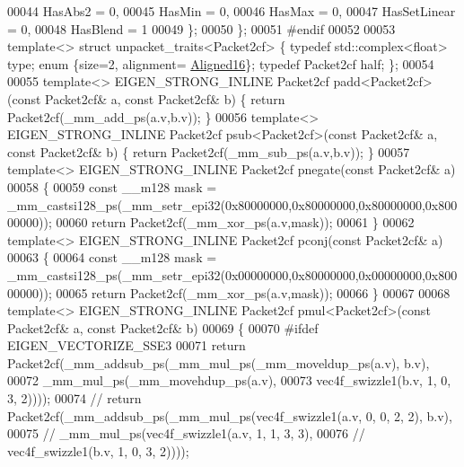 \begin{DoxyCode}
00044     HasAbs2   = 0,
00045     HasMin    = 0,
00046     HasMax    = 0,
00047     HasSetLinear = 0,
00048     HasBlend = 1
00049   \};
00050 \};
00051 \textcolor{preprocessor}{#endif}
00052 
00053 \textcolor{keyword}{template}<> \textcolor{keyword}{struct }unpacket\_traits<Packet2cf> \{ \textcolor{keyword}{typedef} std::complex<float> type; \textcolor{keyword}{enum} \{size=2, alignment=
      \hyperlink{group__enums_gga45fe06e29902b7a2773de05ba27b47a1af8e2bf74b04c02199f62c5e3c06dbfcc}{Aligned16}\}; \textcolor{keyword}{typedef} Packet2cf half; \};
00054 
00055 \textcolor{keyword}{template}<> EIGEN\_STRONG\_INLINE Packet2cf padd<Packet2cf>(\textcolor{keyword}{const} Packet2cf& a, \textcolor{keyword}{const} Packet2cf& b) \{ \textcolor{keywordflow}{return} 
      Packet2cf(\_mm\_add\_ps(a.v,b.v)); \}
00056 \textcolor{keyword}{template}<> EIGEN\_STRONG\_INLINE Packet2cf psub<Packet2cf>(\textcolor{keyword}{const} Packet2cf& a, \textcolor{keyword}{const} Packet2cf& b) \{ \textcolor{keywordflow}{return} 
      Packet2cf(\_mm\_sub\_ps(a.v,b.v)); \}
00057 \textcolor{keyword}{template}<> EIGEN\_STRONG\_INLINE Packet2cf pnegate(\textcolor{keyword}{const} Packet2cf& a)
00058 \{
00059   \textcolor{keyword}{const} \_\_m128 mask = \_mm\_castsi128\_ps(\_mm\_setr\_epi32(0x80000000,0x80000000,0x80000000,0x80000000));
00060   \textcolor{keywordflow}{return} Packet2cf(\_mm\_xor\_ps(a.v,mask));
00061 \}
00062 \textcolor{keyword}{template}<> EIGEN\_STRONG\_INLINE Packet2cf pconj(\textcolor{keyword}{const} Packet2cf& a)
00063 \{
00064   \textcolor{keyword}{const} \_\_m128 mask = \_mm\_castsi128\_ps(\_mm\_setr\_epi32(0x00000000,0x80000000,0x00000000,0x80000000));
00065   \textcolor{keywordflow}{return} Packet2cf(\_mm\_xor\_ps(a.v,mask));
00066 \}
00067 
00068 \textcolor{keyword}{template}<> EIGEN\_STRONG\_INLINE Packet2cf pmul<Packet2cf>(\textcolor{keyword}{const} Packet2cf& a, \textcolor{keyword}{const} Packet2cf& b)
00069 \{
00070 \textcolor{preprocessor}{  #ifdef EIGEN\_VECTORIZE\_SSE3}
00071   \textcolor{keywordflow}{return} Packet2cf(\_mm\_addsub\_ps(\_mm\_mul\_ps(\_mm\_moveldup\_ps(a.v), b.v),
00072                                  \_mm\_mul\_ps(\_mm\_movehdup\_ps(a.v),
00073                                             vec4f\_swizzle1(b.v, 1, 0, 3, 2))));
00074 \textcolor{comment}{//   return Packet2cf(\_mm\_addsub\_ps(\_mm\_mul\_ps(vec4f\_swizzle1(a.v, 0, 0, 2, 2), b.v),}
00075 \textcolor{comment}{//                                  \_mm\_mul\_ps(vec4f\_swizzle1(a.v, 1, 1, 3, 3),}
00076 \textcolor{comment}{//                                             vec4f\_swizzle1(b.v, 1, 0, 3, 2))));}

\end{DoxyCode}
